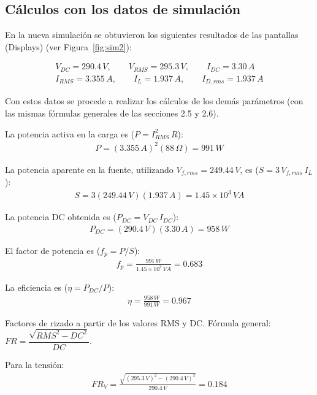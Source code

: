 \documentclass[11pt]{article}
\begin{document}
\subsection{C\'alculos con los datos de simulaci\'on}

En la nueva simulaci\'on se obtuvieron los siguientes resultados de las
pantallas (Displays) (ver Figura~\ref{fig:sim2}):

\begin{align*}
V_{DC} = 290.4\,V, \qquad V_{RMS} = 295.3\,V, \qquad I_{DC} = 3.30\,A \\
I_{RMS} = 3.355\,A, \qquad I_L = 1.937\,A, \qquad I_{D,rms} = 1.937\,A
\end{align*}

Con estos datos se procede a realizar los c\'alculos de los dem\'as par\'ametros
(con las mismas f\'ormulas generales de las secciones 2.5 y 2.6).

La potencia activa en la carga es ($P = I_{RMS}^2\,R$):
\begin{align*}
P = (3.355\,A)^2(88\,\Omega) = \boxed{991\,W}
\end{align*}

La potencia aparente en la fuente, utilizando $V_{f,rms} = 249.44\,V$, es
($S = 3\,V_{f,rms}\,I_L$):
\begin{align*}
S = 3(249.44\,V)(1.937\,A) = \boxed{1.45\times10^{3}\,VA}
\end{align*}

La potencia DC obtenida es ($P_{DC} = V_{DC}\,I_{DC}$):
\begin{align*}
P_{DC} = (290.4\,V)(3.30\,A) = \boxed{958\,W}
\end{align*}

El factor de potencia es ($f_p = P/S$):
\begin{align*}
f_p = \frac{991\,W}{1.45\times10^{3}\,VA} = \boxed{0.683}
\end{align*}

La eficiencia es ($\eta = P_{DC}/P$):
\begin{align*}
\eta = \frac{958\,W}{991\,W} = \boxed{0.967}
\end{align*}

Factores de rizado a partir de los valores RMS y DC. F\'ormula general:
$FR = \dfrac{\sqrt{RMS^2 - DC^2}}{DC}$.

Para la tensi\'on:
\begin{align*}
FR_V = \frac{\sqrt{(295.3\,V)^2 - (290.4\,V)^2}}{290.4\,V} = \boxed{0.184}
\end{align*}
\end{document}
